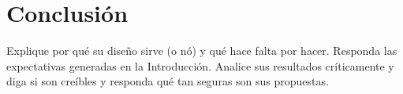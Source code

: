 \section{Conclusión}
Explique por qué su diseño sirve (o nó) y qué hace falta por hacer.
Responda las expectativas generadas en la Introducción.
Analice sus resultados críticamente y diga si son creíbles y responda qué tan seguras son sus propuestas.
